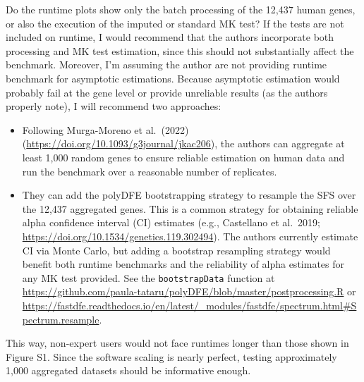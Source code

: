 
\begin{point}{} %
Do the runtime plots show only the batch processing of the 12,437
human genes, or also the execution of the imputed or standard MK test?
If the tests are not included on runtime, I would recommend that the
authors incorporate both processing and MK test estimation, since this
should not substantially affect the benchmark. Moreover, I'm assuming
the author are not providing runtime benchmark for asymptotic
estimations. Because asymptotic estimation would probably fail at the
gene level or provide unreliable results (as the authors properly
note), I will recommend two approaches:

\begin{itemize}
\item[(i)] Following Murga-Moreno et al.\ (2022)
(\url{https://doi.org/10.1093/g3journal/jkac206}), the authors can
aggregate at least 1{,}000 random genes to ensure reliable estimation
on human data and run the benchmark over a reasonable number of
replicates.
\item[(ii)] They can add the polyDFE bootstrapping strategy to resample
the SFS over the 12{,}437 aggregated genes. This is a common strategy
for obtaining reliable alpha confidence interval (CI) estimates (e.g.,
Castellano et al.\ 2019;
\url{https://doi.org/10.1534/genetics.119.302494}). The authors
currently estimate CI via Monte Carlo, but adding a bootstrap
resampling strategy would benefit both runtime benchmarks and the
reliability of alpha estimates for any MK test provided. See the
\texttt{bootstrapData} function at
\url{https://github.com/paula-tataru/polyDFE/blob/master/postprocessing.R}
or
\url{https://fastdfe.readthedocs.io/en/latest/_modules/fastdfe/spectrum.html#Spectrum.resample}.
\end{itemize}

This way, non-expert users would not face runtimes longer than those
shown in Figure S1. Since the software scaling is nearly perfect,
testing approximately 1{,}000 aggregated datasets should be
informative enough.
\end{point}

